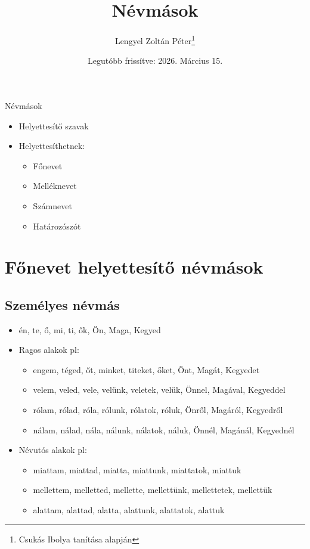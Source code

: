 \documentclass{article}
\title{Névmások}
\author{Lengyel Zoltán Péter\thanks{Csukás Ibolya tanítása alapján}}
\date{Legutóbb frissítve: 2026. Március 15.}
\begin{document}
\maketitle
\tableofcontents
\newpage

\begin{center}
    {\Huge Névmások}
\end{center}

\begin{itemize}
    \item Helyettesítő szavak
    \item Helyettesíthetnek: \begin{itemize}
        \item Főnevet
        \item Melléknevet
        \item Számnevet
        \item Határozószót
    \end{itemize}
\end{itemize}

\section{Főnevet helyettesítő névmások}
\subsection{Személyes névmás}
\begin{itemize}
    \item én, te, ő, mi, ti, ők, Ön, Maga, Kegyed
    \item Ragos alakok pl: \begin{itemize}
        \item engem, téged, őt, minket, titeket, őket, Önt, Magát, Kegyedet
        \item velem, veled, vele, velünk, veletek, velük, Önnel, Magával, Kegyeddel
        \item rólam, rólad, róla, rólunk, rólatok, róluk, Önről, Magáról, Kegyedről
        \item nálam, nálad, nála, nálunk, nálatok, náluk, Önnél, Magánál, Kegyednél
    \end{itemize}
    \item Névutós alakok pl: \begin{itemize}
        \item miattam, miattad, miatta, miattunk, miattatok, miattuk
        \item mellettem, melletted, mellette, mellettünk, mellettetek, mellettük
        \item alattam, alattad, alatta, alattunk, alattatok, alattuk
    \end{itemize}
\end{itemize}
\end{document}
